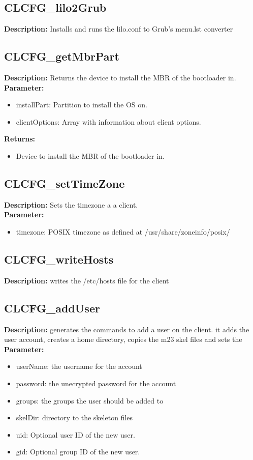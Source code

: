 \subsection{CLCFG\_lilo2Grub}
\textbf{Description:} Installs and runs the lilo.conf to Grub's menu.lst converter\\

\subsection{CLCFG\_getMbrPart}
\textbf{Description:} Returns the device to install the MBR of the bootloader in.\\
\textbf{Parameter:}
\begin{itemize}
\item installPart: Partition to install the OS on.
\item clientOptions: Array with information about client options.
\end{itemize}
\textbf{Returns:}
\begin{itemize}
\item Device to install the MBR of the bootloader in.
\end{itemize}

\subsection{CLCFG\_setTimeZone}
\textbf{Description:} Sets the timezone a a client.\\
\textbf{Parameter:}
\begin{itemize}
\item timezone: POSIX timezone as defined at /usr/share/zoneinfo/posix/
\end{itemize}

\subsection{CLCFG\_writeHosts}
\textbf{Description:} writes the /etc/hosts file for the client\\

\subsection{CLCFG\_addUser}
\textbf{Description:} generates the commands to add a user on the client. it adds the user account, creates a home directory, copies the m23 skel files and sets the\\
\textbf{Parameter:}
\begin{itemize}
\item userName: the username for the account
\item password: the unecrypted password for the account
\item groups: the groups the user should be added to
\item skelDir: directory to the skeleton files
\item uid: Optional user ID of the new user.
\item gid: Optional group ID of the new user.
\end{itemize}

